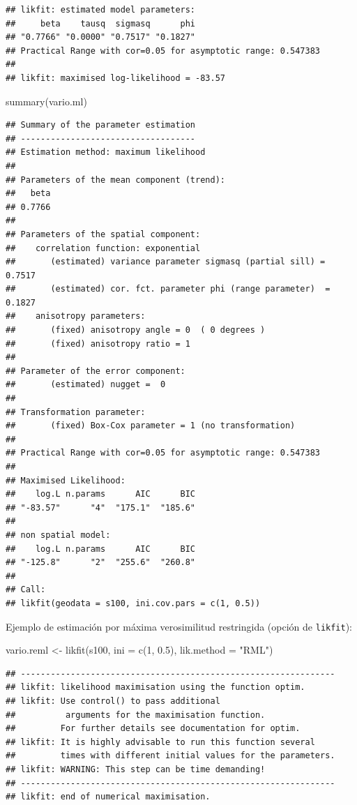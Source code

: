 \documentclass[
  spanish,
]{book}
\newenvironment{Shaded}{\begin{snugshade}}{\end{snugshade}}
\newcommand{\AttributeTok}[1]{\textcolor[rgb]{0.77,0.63,0.00}{#1}}
\newcommand{\DecValTok}[1]{\textcolor[rgb]{0.00,0.00,0.81}{#1}}
\newcommand{\FloatTok}[1]{\textcolor[rgb]{0.00,0.00,0.81}{#1}}
\newcommand{\FunctionTok}[1]{\textcolor[rgb]{0.00,0.00,0.00}{#1}}
\newcommand{\NormalTok}[1]{#1}
\newcommand{\OtherTok}[1]{\textcolor[rgb]{0.56,0.35,0.01}{#1}}
\newcommand{\StringTok}[1]{\textcolor[rgb]{0.31,0.60,0.02}{#1}}
\theoremstyle{break}
\begin{document}
\begin{verbatim}
## likfit: estimated model parameters:
##     beta    tausq  sigmasq      phi 
## "0.7766" "0.0000" "0.7517" "0.1827" 
## Practical Range with cor=0.05 for asymptotic range: 0.547383
## 
## likfit: maximised log-likelihood = -83.57
\end{verbatim}

\begin{Shaded}
\begin{Highlighting}[]
\FunctionTok{summary}\NormalTok{(vario.ml)}
\end{Highlighting}
\end{Shaded}

\begin{verbatim}
## Summary of the parameter estimation
## -----------------------------------
## Estimation method: maximum likelihood 
## 
## Parameters of the mean component (trend):
##   beta 
## 0.7766 
## 
## Parameters of the spatial component:
##    correlation function: exponential
##       (estimated) variance parameter sigmasq (partial sill) =  0.7517
##       (estimated) cor. fct. parameter phi (range parameter)  =  0.1827
##    anisotropy parameters:
##       (fixed) anisotropy angle = 0  ( 0 degrees )
##       (fixed) anisotropy ratio = 1
## 
## Parameter of the error component:
##       (estimated) nugget =  0
## 
## Transformation parameter:
##       (fixed) Box-Cox parameter = 1 (no transformation)
## 
## Practical Range with cor=0.05 for asymptotic range: 0.547383
## 
## Maximised Likelihood:
##    log.L n.params      AIC      BIC 
## "-83.57"      "4"  "175.1"  "185.6" 
## 
## non spatial model:
##    log.L n.params      AIC      BIC 
## "-125.8"      "2"  "255.6"  "260.8" 
## 
## Call:
## likfit(geodata = s100, ini.cov.pars = c(1, 0.5))
\end{verbatim}

Ejemplo de estimación por máxima verosimilitud restringida (opción de
\texttt{likfit}):

\begin{Shaded}
\begin{Highlighting}[]
\NormalTok{vario.reml }\OtherTok{\textless{}{-}} \FunctionTok{likfit}\NormalTok{(s100, }\AttributeTok{ini =} \FunctionTok{c}\NormalTok{(}\DecValTok{1}\NormalTok{, }\FloatTok{0.5}\NormalTok{), }\AttributeTok{lik.method =} \StringTok{"RML"}\NormalTok{)}
\end{Highlighting}
\end{Shaded}

\begin{verbatim}
## ---------------------------------------------------------------
## likfit: likelihood maximisation using the function optim.
## likfit: Use control() to pass additional
##          arguments for the maximisation function.
##         For further details see documentation for optim.
## likfit: It is highly advisable to run this function several
##         times with different initial values for the parameters.
## likfit: WARNING: This step can be time demanding!
## ---------------------------------------------------------------
## likfit: end of numerical maximisation.
\end{verbatim}
\end{document}
